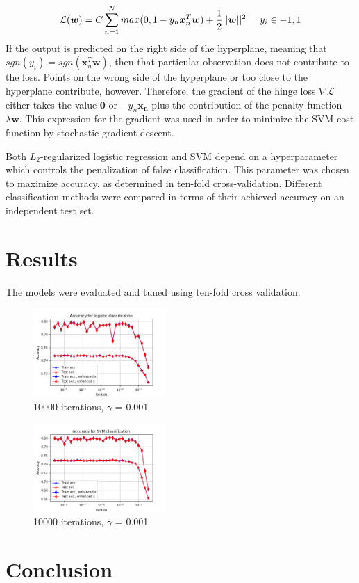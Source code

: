 \documentclass[10pt,conference,compsocconf]{IEEEtran}
\begin{document}
\begin{equation}
\mathcal{L}(\boldsymbol{w}) = C \sum_{n=1}^N max(0,1-y_n \boldsymbol{x}_n^T\boldsymbol{w}) + \frac{1}{2}||\boldsymbol{w}||^2 \hspace{5mm} y_i \in {-1,1}
\end{equation}  
If the output is predicted on the right side of the hyperplane, meaning that $sgn(y_i) = sgn(\boldsymbol{x}_n^T\boldsymbol{w})$, then that particular observation does not contribute to the loss. Points on the wrong side of the hyperplane or too close to the hyperplane contribute, however. Therefore, the gradient of the hinge loss $\nabla \mathcal{L}$ either takes the value $\boldsymbol{0}$ or $-y_n\boldsymbol{x_n}$ plus the contribution of the penalty function $\lambda \boldsymbol{w}$. This expression for the gradient was used in order to minimize the SVM cost function by stochastic gradient descent.  
\par
Both $L_2$-regularized logistic regression and SVM depend on a hyperparameter which controls the penalization of false classification. This parameter was chosen to maximize accuracy, as determined in ten-fold cross-validation. Different classification methods were compared in terms of their achieved accuracy on an independent test set. %
\par
\section*{Results}
The models were evaluated and tuned using ten-fold cross validation. %
\begin{figure}[H]
	\centering
	\includegraphics[width=0.45\textwidth]{accuracy_logistic.png}
	\caption{10000 iterations, $\gamma$ = 0.001}
\end{figure}

\begin{figure}[H]
	\centering
	\includegraphics[width=0.45\textwidth]{accuracy_SVM.png}
	\caption{10000 iterations, $\gamma$ = 0.001}
\end{figure}


\section*{Conclusion}



\end{document}
